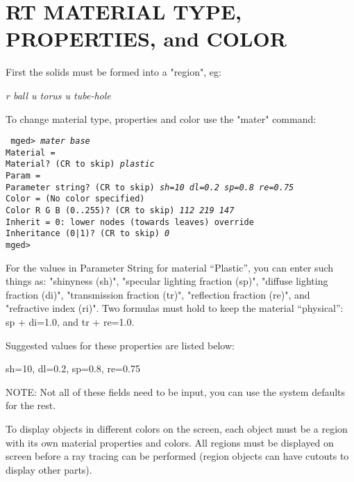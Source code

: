 \chapter{RT MATERIAL TYPE, PROPERTIES, and COLOR}

First the solids must be formed into a "region", eg:

{\em\center
r ball u torus u tube-hole
}

To change material type, properties and color use the "mater" command:

{\tt
mged> {\em mater base} \\
Material = \\
Material?  (CR to skip) {\em plastic} \\
Param = \\
Parameter string? (CR to skip) {\em sh=10 dl=0.2 sp=0.8 re=0.75} \\
Color = (No color specified) \\
Color R G B (0..255)? (CR to skip) {\em 112 219 147} \\
Inherit = 0:  lower nodes (towards leaves) override \\
Inheritance (0|1)? (CR to skip) {\em 0} \\
mged> \\
}

For the values in Parameter String for material ``Plastic'',
you can enter such things as:
"shinyness (sh)",
"specular lighting fraction (sp)",
"diffuse lighting fraction (di)",
"transmission fraction (tr)",
"reflection fraction (re)", and
"refractive index (ri)".
Two formulas must hold to keep the material ``physical'':
sp + di=1.0, and tr + re=1.0.

Suggested values for these properties are listed below:

{\center sh=10, dl=0.2, sp=0.8, re=0.75}

NOTE:  Not all of these fields need to be input, you
can use the system defaults for the rest.

To display objects in different colors on the screen, each object must
be a region with its own material properties and colors.  All regions must be
displayed on screen before a ray tracing can be performed (region objects can
have cutouts to display other parts).

